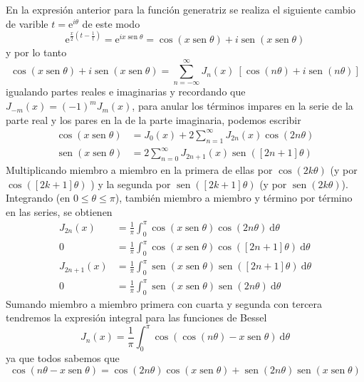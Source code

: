 \documentclass[spanish,notitlepage,letterpaper,12pt]{article}
\begin{document}
En la expresi\'{o}n anterior para la funci\'{o}n generatriz se realiza el
siguiente cambio de varible $t=\mathrm{e}^{i\theta}$ de este modo
\[
\mathrm{e}^{\frac x2\left(  t-\frac1t\right)  }=\mathrm{e}%
^{ix\operatorname*{sen}\theta}=\cos\left(  x\operatorname*{sen}\theta\right)
+i\operatorname*{sen}\left(  x\operatorname*{sen}\theta\right)
\]
y por lo tanto
\[
\cos\left(  x\operatorname*{sen}\theta\right)  +i\operatorname*{sen}\left(
x\operatorname*{sen}\theta\right)  =\sum_{n=-\infty}^{\infty}J_{n}(x)\ \left[
\cos\left(  n\theta\right)  +i\operatorname*{sen}\left(  n\theta\right)
\right]
\]
igualando partes reales e imaginarias y recordando que $J_{-m}(x)=\left(
-1\right)  ^{m}J_{m}(x)$, para anular los t\'{e}rminos impares en la serie de
la parte real y los pares en la de la parte imaginaria, podemos escribir
\begin{align*}
\cos\left(  x\operatorname*{sen}\theta\right)   & =J_{0}(x)+2\sum
_{n=1}^{\infty}J_{2n}(x)\cos\left(  2n\theta\right) \\
\operatorname*{sen}\left(  x\operatorname*{sen}\theta\right)   & =2\sum
_{n=0}^{\infty}J_{2n+1}(x)\operatorname*{sen}\left(  \left[  2n+1\right]
\theta\right)
\end{align*}
Multiplicando miembro a miembro en la primera de ellas por $\cos\left(
2k\theta\right)  $ (y por $\cos\left(  \left[  2k+1\right]  \theta\right)  $ )
y la segunda por $\operatorname*{sen}\left(  \left[  2k+1\right]
\theta\right)  $ (y por $\operatorname*{sen}\left(  2k\theta\right)  $).
Integrando (en $0\leq\theta\leq\pi$), tambi\'{e}n miembro a miembro y
t\'{e}rmino por t\'{e}rmino en las series, se obtienen
\begin{align*}
J_{2n}(x)  & =\frac1\pi\int_{0}^{\pi}\cos\left(  x\operatorname*{sen}%
\theta\right)  \cos\left(  2n\theta\right)  \ \mathrm{d}\theta\\
0  & =\frac1\pi\int_{0}^{\pi}\cos\left(  x\operatorname*{sen}\theta\right)
\cos\left(  \left[  2n+1\right]  \theta\right)  \ \mathrm{d}\theta\\
J_{2n+1}(x)  & =\frac1\pi\int_{0}^{\pi}\operatorname*{sen}\left(
x\operatorname*{sen}\theta\right)  \operatorname*{sen}\left(  \left[
2n+1\right]  \theta\right)  \ \mathrm{d}\theta\\
0  & =\frac1\pi\int_{0}^{\pi}\operatorname*{sen}\left(  x\operatorname*{sen}%
\theta\right)  \operatorname*{sen}\left(  2n\theta\right)  \ \mathrm{d}\theta
\end{align*}
Sumando miembro a miembro primera con cuarta y segunda con tercera tendremos
la expresi\'{o}n integral para las funciones de Bessel
\[
J_{n}(x)=\frac1\pi\int_{0}^{\pi}\cos\left(  \cos\left(  n\theta\right)
-x\operatorname*{sen}\theta\right)  \ \mathrm{d}\theta
\]
ya que todos sabemos que
\[
\cos\left(  n\theta-x\operatorname*{sen}\theta\right)  =\cos\left(
2n\theta\right)  \cos\left(  x\operatorname*{sen}\theta\right)
+\operatorname*{sen}\left(  2n\theta\right)  \operatorname*{sen}\left(
x\operatorname*{sen}\theta\right)
\]
\end{document}
